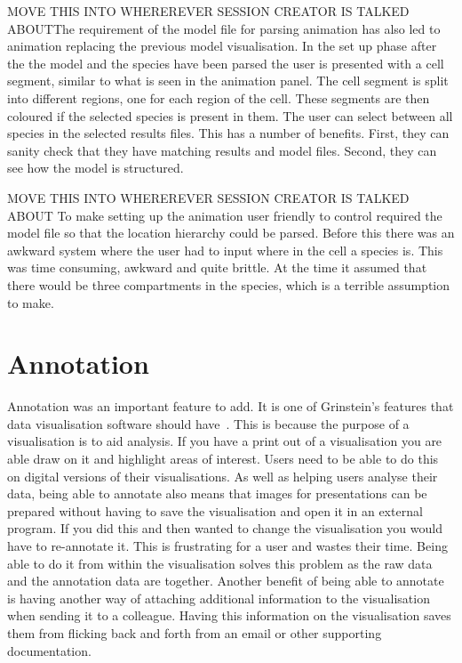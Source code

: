 MOVE THIS INTO WHEREREVER SESSION CREATOR IS TALKED ABOUTThe requirement of the model file for parsing animation has also led to animation replacing the previous model visualisation.  In the set up phase after the the model and the species have been parsed the user is presented with a cell segment, similar to what is seen in the animation panel.  The cell segment is split into different regions, one for each region of the cell.  These segments are then coloured if the selected species is present in them.  The user can select between all species in the selected results files.  This has a number of benefits.  First, they can sanity check that they have matching results and model files.  Second, they can see how the model is structured.

MOVE THIS INTO WHEREREVER SESSION CREATOR IS TALKED ABOUT To make setting up the animation user friendly to control required the model file so that the location hierarchy could be parsed.  Before this there was an awkward system where the user had to input where in the cell a species is.  This was time consuming, awkward and quite brittle.  At the time it assumed that there would be three compartments in the species, which is a terrible assumption to make.

\section{Annotation}

Annotation was an important feature to add.  It is one of Grinstein's features that data visualisation software should have~\cite{gg_vizbi}.  This is because the purpose of a visualisation is to aid analysis.  If you have a print out of a visualisation you are able draw on it and highlight areas of interest.  Users need to be able to do this on digital versions of their visualisations.  As well as helping users analyse their data, being able to annotate also means that images for presentations can be prepared without having to save the visualisation and open it in an external program.  If you did this and then wanted to change the visualisation you would have to re-annotate it.  This is frustrating for a user and wastes their time.  Being able to do it from within the visualisation solves this problem as the raw data and the annotation data are together.  Another benefit of being able to annotate is having another way of attaching additional information to the visualisation when sending it to a colleague. Having this information on the visualisation saves them from flicking back and forth from an email or other supporting documentation.

